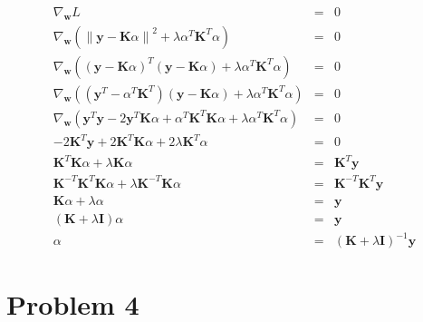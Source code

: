 \documentclass[12pt]{article}
\begin{document}
\begin{eqnarray*}
  \nabla_{\textbf{w}} {L}
  &=& 0 \\
  \nabla_{\textbf{w}} {\left( 
      \left\lVert \textbf{y} - \textbf{K} \alpha \right\rVert^2 
      + \lambda \alpha^T \textbf{K}^T \alpha \right)}
  &=& 0 \\
  \nabla_{\textbf{w}} {\left( \left(\textbf{y} - \textbf{K} \alpha \right)^T
      \left(\textbf{y} - \textbf{K} \alpha \right)
      + \lambda \alpha^T \textbf{K}^T \alpha \right)}
  &=& 0 \\
  \nabla_{\textbf{w}} {\left( 
      \left(\textbf{y}^T - \alpha^T \textbf{K}^T \right)
      \left(\textbf{y} - \textbf{K} \alpha \right) 
      + \lambda \alpha^T \textbf{K}^T \alpha \right)}
  &=& 0 \\
  \nabla_{\textbf{w}} {\left( 
      \textbf{y}^T \textbf{y} - 2 \textbf{y}^T \textbf{K} \alpha
      + \alpha^T \textbf{K}^T \textbf{K} \alpha 
      + \lambda \alpha^T \textbf{K}^T \alpha \right)}
  &=& 0 \\
  - 2 \textbf{K}^T \textbf{y} + 2 \textbf{K}^T \textbf{K} \alpha 
  + 2 \lambda \textbf{K}^T \alpha
  &=& 0 \\
  \textbf{K}^T \textbf{K} \alpha + \lambda \textbf{K} \alpha
  &=& \textbf{K}^T \textbf{y} \\
  \textbf{K}^{-T} \textbf{K}^T \textbf{K} \alpha
  + \lambda \textbf{K}^{-T} \textbf{K} \alpha
  &=& \textbf{K}^{-T} \textbf{K}^T \textbf{y} \\
  \textbf{K} \alpha + \lambda \alpha
  &=& \textbf{y} \\
  \left( \textbf{K} + \lambda \textbf{I} \right) \alpha
  &=& \textbf{y} \\
  \alpha &=& \left( \textbf{K} + \lambda \textbf{I} \right)^{-1} \textbf{y}
\end{eqnarray*}

\section*{Problem 4}
\end{document}

